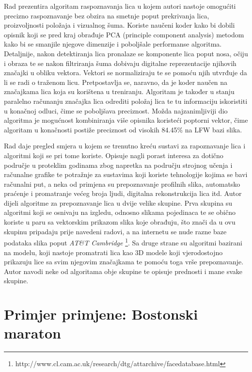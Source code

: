 \documentclass[times, utf8, seminar, numeric]{fer}
\begin{document}
Rad \cite{5539992} prezentira algoritam raspoznavanja lica u kojem autori nastoje omogućiti precizno raspoznavanje bez obzira na smetnje poput prekrivanja lica, proizvoljnosti položaja i vizualnog šuma. Koriste naučeni koder kako bi dobili opisnik koji se pred kraj obrađuje PCA (principle component analysis) metodom kako bi se smanjile njegove dimenzije i poboljšale performanse algoritma.   Detaljnije, nakon detektiranja lica pronalaze se komponente lica poput nosa, očiju i obraza te se nakon filtriranja šuma dobivaju digitalne reprezentacije njihovih značajki u obliku vektora. Vektori se normaliziraju te se pomoću njih utvrđuje da li se radi o traženom licu. Pretpostavlja se, naravno, da je koder naučen na značajkama lica koja su korištena u treniranju. Algoritam je također u stanju paralelno računanju značajka lica odrediti položaj lica te tu informaciju iskoristiti u konačnoj odluci, čime se poboljšava preciznost. Možda najzanimljiviji dio algoritma je mogućnost kombiniranja više opisnika koristeći poptorni vektor, čime algoritam u konačnosti postiže preciznost od visokih 84.45\% na LFW \cite{Huang_labeledfaces} bazi slika.

Rad \cite{Lu_imageanalysis} daje pregled smjera u kojem se trenutno kreću sustavi za rapoznavanje lica i algoritmi koji se pri tome koriste. Opisuje nagli porast interesa za dotično područje u proteklim godinama zbog napretka na području strojnog učenja i računalne grafike te potražnje za sustavima koji koriste tehnologije kojima se bavi računalni put, a neka od primjena su prepoznavanje profilnih slika, automatsko praćenje i promatranje većeg broja ljudi, digitalna rekonstrukcija lica itd. Autor dijeli algoritme za prepoznavanje lica u dvije velike skupine. Prva skupina su algoritmi koji se osnivaju na izgledu, odnosno slikama pojedinaca te se obično koriste u paru sa vektorskim prikazom slika koje obrađuju, što znači da u ovu skupinu pripadaju prije navedeni radovi, a na internetu se nude razne baze podataka slika poput \textit{AT\&T Cambridge} \footnote{http://www.cl.cam.ac.uk/research/dtg/attarchive/facedatabase.html}. Sa druge strane su algoritmi bazirani na modelu, koji nastoje promatrati lica kao 3D modele koji vjerodostojno prikazuju lice sa svim njegovim značajkama te pomoću toga vrše prepoznavanje. Autor navodi neke od algoritama obje skupine te opisuje prednosti i mane svake skupine.

\section{Primjer primjene: Bostonski maraton}
\end{document}
